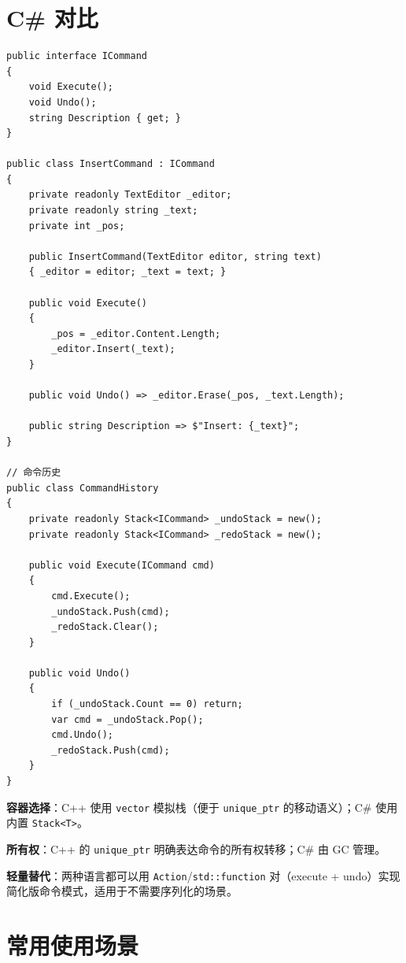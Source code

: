 \documentclass[12pt,a4paper,fontset=fandol]{ctexbook}
\begin{document}
\section{C\# 对比}

\begin{lstlisting}[style=csharpstyle, caption={命令模式 --- C\# 实现}]
public interface ICommand
{
    void Execute();
    void Undo();
    string Description { get; }
}

public class InsertCommand : ICommand
{
    private readonly TextEditor _editor;
    private readonly string _text;
    private int _pos;

    public InsertCommand(TextEditor editor, string text)
    { _editor = editor; _text = text; }

    public void Execute()
    {
        _pos = _editor.Content.Length;
        _editor.Insert(_text);
    }

    public void Undo() => _editor.Erase(_pos, _text.Length);

    public string Description => $"Insert: {_text}";
}

// 命令历史
public class CommandHistory
{
    private readonly Stack<ICommand> _undoStack = new();
    private readonly Stack<ICommand> _redoStack = new();

    public void Execute(ICommand cmd)
    {
        cmd.Execute();
        _undoStack.Push(cmd);
        _redoStack.Clear();
    }

    public void Undo()
    {
        if (_undoStack.Count == 0) return;
        var cmd = _undoStack.Pop();
        cmd.Undo();
        _redoStack.Push(cmd);
    }
}
\end{lstlisting}

\begin{compare}
\textbf{容器选择}：C++ 使用 \texttt{vector} 模拟栈（便于 \texttt{unique\_ptr} 的移动语义）；C\# 使用内置 \texttt{Stack<T>}。

\textbf{所有权}：C++ 的 \texttt{unique\_ptr} 明确表达命令的所有权转移；C\# 由 GC 管理。

\textbf{轻量替代}：两种语言都可以用 \texttt{Action}/\allowbreak{}\texttt{std::function} 对（execute + undo）实现简化版命令模式，适用于不需要序列化的场景。
\end{compare}

\section{常用使用场景}
\end{document}

